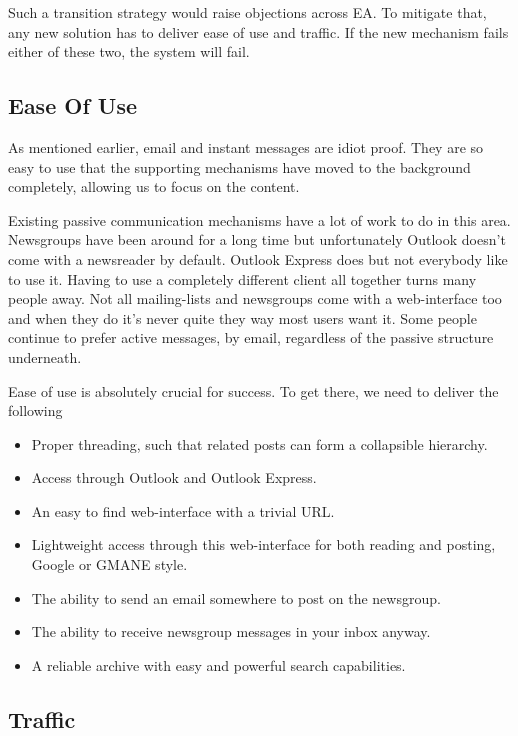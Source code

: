 \documentclass[twocolumn]{paper}
\begin{document}
Such a transition strategy would raise objections across EA. To
mitigate that, any new solution has to deliver ease of use and
traffic. If the new mechanism fails either of these two, the system
will fail.

\subsection{Ease Of Use}

As mentioned earlier, email and instant messages are idiot proof.
They are so easy to use that the supporting mechanisms have moved to
the background completely, allowing us to focus on the content.

Existing passive communication mechanisms have a lot of work to do
in this area. Newsgroups have been around for a long time but
unfortunately Outlook doesn't come with a newsreader by default.
Outlook Express does but not everybody like to use it. Having to use
a completely different client all together turns many people away.
Not all mailing-lists and newsgroups come with a web-interface too
and when they do it's never quite they way most users want it. Some
people continue to prefer active messages, by email, regardless of
the passive structure underneath.

Ease of use is absolutely crucial for success. To get there, we need
to deliver the following

\begin{itemize}
    \item Proper threading, such that related posts can form a
    collapsible hierarchy.
    \item Access through Outlook and Outlook Express.
    \item An easy to find web-interface with a trivial URL.
    \item Lightweight access through this web-interface for both reading and
    posting, Google or GMANE style.
    \item The ability to send an email somewhere to post on the
    newsgroup.
    \item The ability to receive newsgroup messages in your inbox anyway.
    \item A reliable archive with easy and powerful search
    capabilities.
\end{itemize}

\subsection{Traffic}
\end{document}

